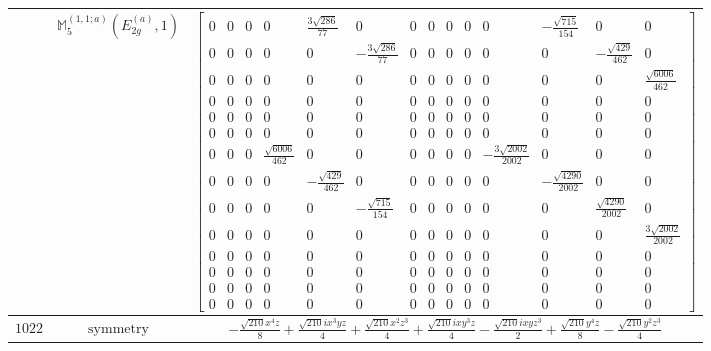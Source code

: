 \documentclass[fleqn,8pt,landscape]{jsarticle}
\begin{document}
\begin{longtable}{ccc}
$  $ & $ \mathbb{M}_{5}^{(1,1;a)}(E_{2g}^{(a)},1) $ & $ \begin{bmatrix} 0 & 0 & 0 & 0 & \frac{3 \sqrt{286}}{77} & 0 & 0 & 0 & 0 & 0 & 0 & - \frac{\sqrt{715}}{154} & 0 & 0 \\ 0 & 0 & 0 & 0 & 0 & - \frac{3 \sqrt{286}}{77} & 0 & 0 & 0 & 0 & 0 & 0 & - \frac{\sqrt{429}}{462} & 0 \\ 0 & 0 & 0 & 0 & 0 & 0 & 0 & 0 & 0 & 0 & 0 & 0 & 0 & \frac{\sqrt{6006}}{462} \\ 0 & 0 & 0 & 0 & 0 & 0 & 0 & 0 & 0 & 0 & 0 & 0 & 0 & 0 \\ 0 & 0 & 0 & 0 & 0 & 0 & 0 & 0 & 0 & 0 & 0 & 0 & 0 & 0 \\ 0 & 0 & 0 & 0 & 0 & 0 & 0 & 0 & 0 & 0 & 0 & 0 & 0 & 0 \\ 0 & 0 & 0 & \frac{\sqrt{6006}}{462} & 0 & 0 & 0 & 0 & 0 & 0 & - \frac{3 \sqrt{2002}}{2002} & 0 & 0 & 0 \\ 0 & 0 & 0 & 0 & - \frac{\sqrt{429}}{462} & 0 & 0 & 0 & 0 & 0 & 0 & - \frac{\sqrt{4290}}{2002} & 0 & 0 \\ 0 & 0 & 0 & 0 & 0 & - \frac{\sqrt{715}}{154} & 0 & 0 & 0 & 0 & 0 & 0 & \frac{\sqrt{4290}}{2002} & 0 \\ 0 & 0 & 0 & 0 & 0 & 0 & 0 & 0 & 0 & 0 & 0 & 0 & 0 & \frac{3 \sqrt{2002}}{2002} \\ 0 & 0 & 0 & 0 & 0 & 0 & 0 & 0 & 0 & 0 & 0 & 0 & 0 & 0 \\ 0 & 0 & 0 & 0 & 0 & 0 & 0 & 0 & 0 & 0 & 0 & 0 & 0 & 0 \\ 0 & 0 & 0 & 0 & 0 & 0 & 0 & 0 & 0 & 0 & 0 & 0 & 0 & 0 \\ 0 & 0 & 0 & 0 & 0 & 0 & 0 & 0 & 0 & 0 & 0 & 0 & 0 & 0 \end{bmatrix} $ \\ \hline
$ 1022 $ & $ \text{symmetry} $ & $ - \frac{\sqrt{210} x^{4} z}{8} + \frac{\sqrt{210} i x^{3} y z}{4} + \frac{\sqrt{210} x^{2} z^{3}}{4} + \frac{\sqrt{210} i x y^{3} z}{4} - \frac{\sqrt{210} i x y z^{3}}{2} + \frac{\sqrt{210} y^{4} z}{8} - \frac{\sqrt{210} y^{2} z^{3}}{4} $ \\

\end{longtable}
\end{document}
